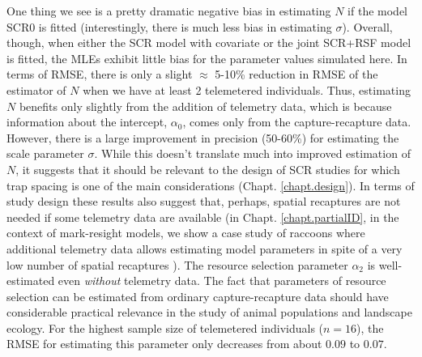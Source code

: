 One thing we see is a pretty dramatic negative bias in estimating $N$
if the model SCR0 is fitted (interestingly, there is much less bias in
estimating $\sigma$).  Overall, though, when either the SCR model with
covariate or the joint SCR+RSF model is fitted, the MLEs exhibit
little bias for the parameter values simulated here. In terms of RMSE,
there is only a slight $\approx$ 5-10\% reduction in RMSE of the
estimator of $N$ when we have at least 2 telemetered individuals.
Thus, estimating $N$ benefits only slightly from the addition of
telemetry data, which is because information about the intercept,
$\alpha_{0}$, comes only from the capture-recapture data.  However,
there is a large improvement in precision (50-60\%) for estimating the
scale parameter $\sigma$.  While this doesn't translate much into
improved estimation of $N$, it suggests that it should be relevant to
the design of SCR studies for which trap spacing is one of the main
considerations (Chapt. \ref{chapt.design}). In terms of study design
these results also suggest that, perhaps, spatial recaptures are not
needed if some telemetry data are available (in
Chapt. \ref{chapt.partialID}, in the context of mark-resight models,
we show a case study of raccoons where additional telemetry data
allows estimating model parameters in spite of a very low number of
spatial recaptures \citep{sollmann_etal:2012ecol}). The resource
selection parameter $\alpha_{2}$ is well-estimated even {\it without}
telemetry data. The fact that parameters of resource selection can be
estimated from ordinary capture-recapture data should have
considerable practical relevance in the study of animal populations
and landscape ecology. For the highest sample size of telemetered
individuals ($n=16$), the RMSE for estimating this parameter only
decreases from about $0.09$ to $0.07$.


